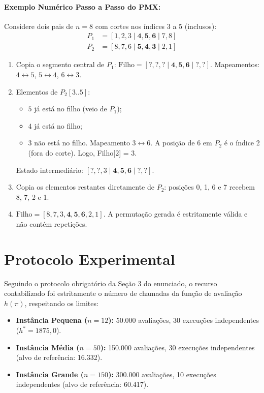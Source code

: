 \documentclass[11pt,a4paper]{article}
\begin{document}
\paragraph{Exemplo Numérico Passo a Passo do PMX:}
Considere dois pais de $n=8$ com cortes nos índices 3 a 5 (inclusos):
\begin{align*}
    P_1 &= [1, 2, 3 \mid \mathbf{4, 5, 6} \mid 7, 8] \\
    P_2 &= [8, 7, 6 \mid \mathbf{5, 4, 3} \mid 2, 1]
\end{align*}
\begin{enumerate}
    \item Copia o segmento central de $P_1$: $\text{Filho} = [?, ?, ? \mid \mathbf{4, 5, 6} \mid ?, ?]$. Mapeamentos: $4 \leftrightarrow 5$, $5 \leftrightarrow 4$, $6 \leftrightarrow 3$.
    \item Elementos de $P_2[3..5]$:
    \begin{itemize}
        \item $5$ já está no filho (veio de $P_1$);
        \item $4$ já está no filho;
        \item $3$ não está no filho. Mapeamento $3 \leftrightarrow 6$. A posição de 6 em $P_2$ é o índice 2 (fora do corte). Logo, Filho[2] = 3.
    \end{itemize}
    Estado intermediário: $[?, ?, 3 \mid \mathbf{4, 5, 6} \mid ?, ?]$.
    \item Copia os elementos restantes diretamente de $P_2$: posições 0, 1, 6 e 7 recebem 8, 7, 2 e 1.
    \item $\text{Filho} = [8, 7, 3, \mathbf{4, 5, 6}, 2, 1]$. A permutação gerada é estritamente válida e não contém repetições.
\end{enumerate}

\section{Protocolo Experimental}

Seguindo o protocolo obrigatório da Seção 3 do enunciado, o recurso contabilizado foi estritamente o número de chamadas da função de avaliação $h(\pi)$, respeitando os limites:
\begin{itemize}
    \item \textbf{Instância Pequena ($n=12$):} 50.000 avaliações, 30 execuções independentes ($h^* = 1875{,}0$).
    \item \textbf{Instância Média ($n=50$):} 150.000 avaliações, 30 execuções independentes (alvo de referência: 16.332).
    \item \textbf{Instância Grande ($n=150$):} 300.000 avaliações, 10 execuções independentes (alvo de referência: 60.417).
\end{itemize}
\end{document}

